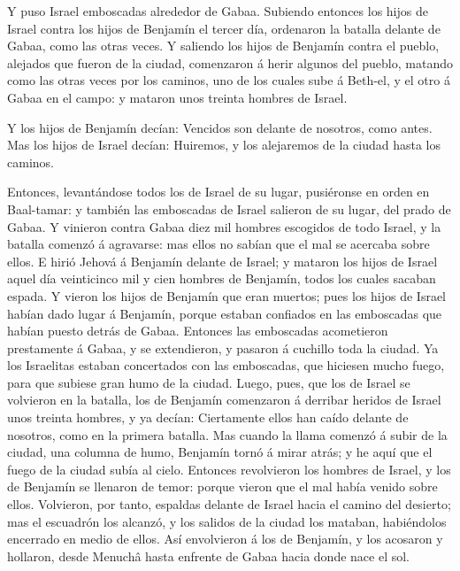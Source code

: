  Y puso Israel emboscadas alrededor de Gabaa. 
Subiendo entonces los hijos de Israel contra los hijos de Benjamín el
tercer día, ordenaron la batalla delante de Gabaa, como las otras veces.
 Y saliendo los hijos de Benjamín contra el pueblo,
alejados que fueron de la ciudad, comenzaron á herir algunos del pueblo,
matando como las otras veces por los caminos, uno de los cuales sube á
Beth-el, y el otro á Gabaa en el campo: y mataron unos treinta hombres
de Israel.

 Y los hijos de Benjamín decían: Vencidos son delante de
nosotros, como antes. Mas los hijos de Israel decían: Huiremos, y los
alejaremos de la ciudad hasta los caminos.

 Entonces, levantándose todos los de Israel de su lugar,
pusiéronse en orden en Baal-tamar: y también las emboscadas de Israel
salieron de su lugar, del prado de Gabaa.  Y vinieron
contra Gabaa diez mil hombres escogidos de todo Israel, y la batalla
comenzó á agravarse: mas ellos no sabían que el mal se acercaba sobre
ellos.  E hirió Jehová á Benjamín delante de Israel; y
mataron los hijos de Israel aquel día veinticinco mil y cien hombres de
Benjamín, todos los cuales sacaban espada.  Y vieron los
hijos de Benjamín que eran muertos; pues los hijos de Israel habían dado
lugar á Benjamín, porque estaban confiados en las emboscadas que habían
puesto detrás de Gabaa.  Entonces las emboscadas
acometieron prestamente á Gabaa, y se extendieron, y pasaron á cuchillo
toda la ciudad.  Ya los Israelitas estaban concertados con
las emboscadas, que hiciesen mucho fuego, para que subiese gran humo de
la ciudad.  Luego, pues, que los de Israel se volvieron en
la batalla, los de Benjamín comenzaron á derribar heridos de Israel unos
treinta hombres, y ya decían: Ciertamente ellos han caído delante de
nosotros, como en la primera batalla.  Mas cuando la llama
comenzó á subir de la ciudad, una columna de humo, Benjamín tornó á
mirar atrás; y he aquí que el fuego de la ciudad subía al cielo.
 Entonces revolvieron los hombres de Israel, y los de
Benjamín se llenaron de temor: porque vieron que el mal había venido
sobre ellos.  Volvieron, por tanto, espaldas delante de
Israel hacia el camino del desierto; mas el escuadrón los alcanzó, y los
salidos de la ciudad los mataban, habiéndolos encerrado en medio de
ellos.  Así envolvieron á los de Benjamín, y los acosaron y
hollaron, desde Menuchâ hasta enfrente de Gabaa hacia donde nace el sol.
